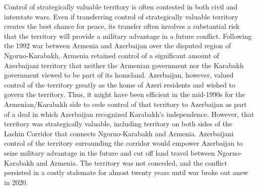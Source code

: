 \documentclass[bibtex,autowc]{apsr_submission}
\begin{document}

Control of strategically valuable territory is often contested in both civil and interstate wars. Even if transferring control of strategically valuable territory creates the best chance for peace, its transfer often involves a substantial risk that the territory will provide a military advantage in a future conflict. Following the 1992 war between Armenia and Azerbaijan over the disputed region of Ngorno-Karabakh, Armenia retained control of a significant amount of Azerbaijani territory that neither the Armenian government nor the Karabakh government viewed to be part of its homeland. Azerbaijan, however, valued control of the territory greatly as the home of Azeri residents and wished to govern the territory. Thus, it might have been efficient in the mid-1990s for the Armenian/Karabakh side to cede control of that territory to Azerbaijan as part of a deal in which Azerbaijan recognized Karabakh's independence. However, that territory was strategically valuable, including territory on both sides of the Lachin Corridor that connects Ngorno-Karabakh and Armenia. Azerbaijani control of the territory surrounding the corridor would empower Azerbaijan to seize military advantage in the future and cut off land travel between Ngorno-Karabakh and Armenia. The territory was not conceded, and the conflict persisted in a costly stalemate for almost twenty years until war broke out anew in 2020. 
\end{document}
